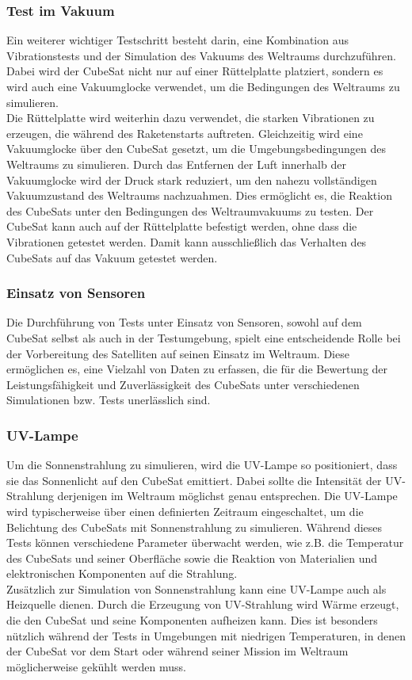 \subsubsection{Test im Vakuum}
Ein weiterer wichtiger Testschritt besteht darin, eine Kombination aus Vibrationstests und der Simulation des Vakuums des Weltraums durchzuführen. Dabei wird der CubeSat nicht nur auf einer Rüttelplatte platziert, sondern es wird auch eine Vakuumglocke verwendet, um die Bedingungen des Weltraums zu simulieren.\\
\newpage
Die Rüttelplatte wird weiterhin dazu verwendet, die starken Vibrationen zu erzeugen, die während des Raketenstarts auftreten. Gleichzeitig wird eine Vakuumglocke über den CubeSat gesetzt, um die Umgebungsbedingungen des Weltraums zu simulieren. 
Durch das Entfernen der Luft innerhalb der Vakuumglocke wird der Druck stark reduziert, um den nahezu vollständigen Vakuumzustand des Weltraums nachzuahmen. Dies ermöglicht es, die Reaktion des CubeSats unter den Bedingungen des Weltraumvakuums zu testen. Der CubeSat kann auch auf der Rüttelplatte befestigt werden, ohne dass die Vibrationen getestet werden. Damit kann ausschließlich das Verhalten des CubeSats auf das Vakuum getestet werden. 

\subsubsection{Einsatz von Sensoren}
Die Durchführung von Tests unter Einsatz von Sensoren, sowohl auf dem CubeSat selbst als auch in der Testumgebung, spielt eine entscheidende Rolle bei der Vorbereitung des Satelliten auf seinen Einsatz im Weltraum. Diese ermöglichen es, eine Vielzahl von Daten zu erfassen, die für die Bewertung der Leistungsfähigkeit und Zuverlässigkeit des CubeSats unter verschiedenen Simulationen bzw. Tests unerlässlich sind.

\subsubsection{UV-Lampe}
Um die Sonnenstrahlung zu simulieren, wird die UV-Lampe so positioniert, dass sie das Sonnenlicht auf den CubeSat emittiert. Dabei sollte die Intensität der UV-Strahlung derjenigen im Weltraum möglichst genau entsprechen. Die UV-Lampe wird typischerweise über einen definierten Zeitraum eingeschaltet, um die Belichtung des CubeSats mit Sonnenstrahlung zu simulieren. Während dieses Tests können verschiedene Parameter überwacht werden, wie z.B. die Temperatur des CubeSats und seiner Oberfläche sowie die Reaktion von Materialien und elektronischen Komponenten auf die Strahlung.\\
\vspace{3mm}
Zusätzlich zur Simulation von Sonnenstrahlung kann eine UV-Lampe auch als Heizquelle dienen. Durch die Erzeugung von UV-Strahlung wird Wärme erzeugt, die den CubeSat und seine Komponenten aufheizen kann. Dies ist besonders nützlich während der Tests in Umgebungen mit niedrigen Temperaturen, in denen der CubeSat vor dem Start oder während seiner Mission im Weltraum möglicherweise gekühlt werden muss.
\newpage
